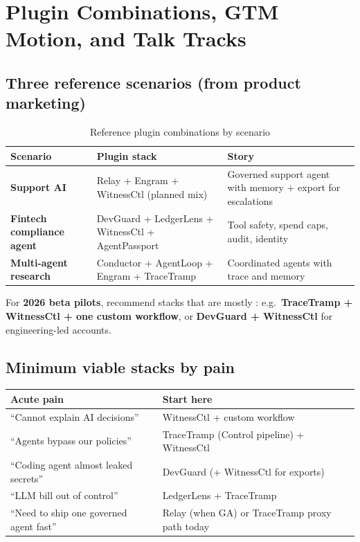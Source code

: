 \chapter{Plugin Combinations, GTM Motion, and Talk Tracks}

\section{Three reference scenarios (from product marketing)}

\begin{table}[H]
\centering
\small
\renewcommand{\arraystretch}{1.3}
\begin{tabularx}{0.95\textwidth}{@{}>{\bfseries}p{} p{} X@{}}
\toprule
Scenario & Plugin stack & Story \\
\midrule
Support AI & Relay + Engram + WitnessCtl (planned mix) & Governed support agent with memory + export for escalations \\
Fintech compliance agent & DevGuard + LedgerLens + WitnessCtl + AgentPassport & Tool safety, spend caps, audit, identity \\
Multi-agent research & Conductor + AgentLoop + Engram + TraceTramp & Coordinated agents with trace and memory \\
\bottomrule
\end{tabularx}
\caption{Reference plugin combinations by scenario}
\end{table}

\noindent For \textbf{2026 beta pilots}, recommend stacks that are mostly \statusship: e.g.\ \textbf{TraceTramp + WitnessCtl + one custom workflow}, or \textbf{DevGuard + WitnessCtl} for engineering-led accounts.

\section{Minimum viable stacks by pain}

\begin{center}
\renewcommand{\arraystretch}{1.3}
\begin{tabularx}{0.95\textwidth}{@{}l X@{}}
\toprule
\textbf{Acute pain} & \textbf{Start here} \\
\midrule
``Cannot explain AI decisions'' & WitnessCtl + custom workflow \\
``Agents bypass our policies'' & TraceTramp (Control pipeline) + WitnessCtl \\
``Coding agent almost leaked secrets'' & DevGuard (+ WitnessCtl for exports) \\
``LLM bill out of control'' & LedgerLens + TraceTramp \\
``Need to ship one governed agent fast'' & Relay (when GA) or TraceTramp proxy path today \\
\bottomrule
\end{tabularx}
\end{center}

